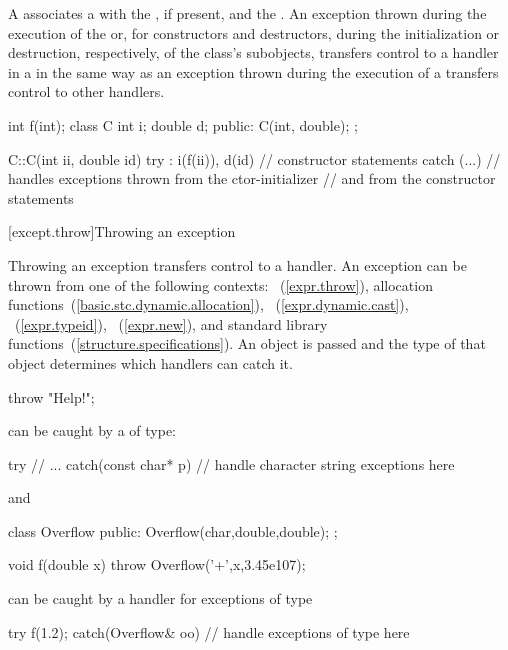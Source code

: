 \pnum
{}%
%
A
associates a
with the
,
if present, and the
.
An exception
thrown during the execution of the
or, for constructors and destructors, during the initialization or
destruction, respectively, of the class's subobjects,
transfers control to a handler in a
in the same way as an exception thrown during the execution of a
transfers control to other handlers.
\enterexample
\begin{codeblock}
int f(int);
class C {
  int i;
  double d;
public:
  C(int, double);
};

C::C(int ii, double id)
try : i(f(ii)), d(id) {
    // constructor statements
}
catch (...) {
    // handles exceptions thrown from the ctor-initializer
    // and from the constructor statements
}

\end{codeblock}
\exitexample


[except.throw]{Throwing an exception}%
%

\pnum
Throwing an exception transfers control to a handler.
\enternote
An exception can be thrown from one of the following contexts:
~(\ref{expr.throw}),
allocation functions~(\ref{basic.stc.dynamic.allocation}),
~(\ref{expr.dynamic.cast}),
~(\ref{expr.typeid}),
~(\ref{expr.new}), and standard library
functions~(\ref{structure.specifications}).
\exitnote
An object is passed and the type of that object determines which handlers
can catch it.
\enterexample
\begin{codeblock}
throw "Help!";
\end{codeblock}
can be caught by a
of
type:
\begin{codeblock}
try {
    // ...
}
catch(const char* p) {
    // handle character string exceptions here
}
\end{codeblock}
and
\begin{codeblock}
class Overflow {
public:
    Overflow(char,double,double);
};

void f(double x) {
    throw Overflow('+',x,3.45e107);
}
\end{codeblock}
can be caught by a handler for exceptions of type
\begin{codeblock}
try {
    f(1.2);
} catch(Overflow& oo) {
    // handle exceptions of type  here
}
\end{codeblock}
\exitexample

